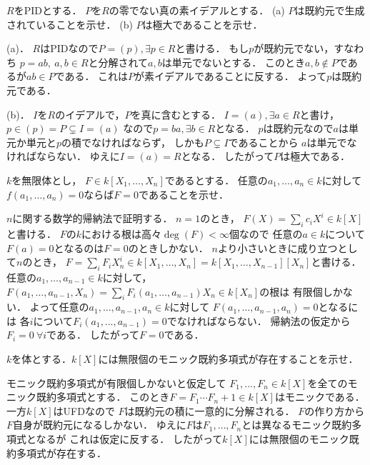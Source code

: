 \begin{prob}
  $R$をPIDとする．
  $P$を$R$の零でない真の素イデアルとする．
  (a) $P$は既約元で生成されていることを示せ．
  (b) $P$は極大であることを示せ．
\end{prob}
\begin{ans}
  (a)．
  $R$はPIDなので$P = (p), \exists p \in R$と書ける．
  もし$p$が既約元でない，すなわち
  $p = ab, \ a,b\in R$と分解されて$a,b$は単元でないとする．
  このとき$a,b \not\in P$であるが$ab \in P$である．
  これは$P$が素イデアルであることに反する．
  よって$p$は既約元である．

  (b)．
  $I$を$R$のイデアルで，$P$を真に含むとする．
  $I = (a), \exists a\in R$と書け，
  $p \in (p) = P \subsetneq I = (a)$
  なので$p = ba, \exists b \in R$となる．
  $p$は既約元なので$a$は単元か単元と$p$の積でなければならず，
  しかも$P \subsetneq I$であることから
  $a$は単元でなければならない．
  ゆえに$I = (a) = R$となる．
  したがって$P$は極大である．
\end{ans}

\begin{prob}
  $k$を無限体とし，
  $F \in k[X_1, \dots ,X_n]$であるとする．
  任意の$a_1,\dots ,a_n \in k$に対して
  $f(a_1,\dots,a_n) = 0$ならば$F = 0$であることを示せ．
\end{prob}
\begin{ans}
  $n$に関する数学的帰納法で証明する．
  $n=1$のとき，
  $F(X) = \sum_i c_i X^i \in k[X]$と書ける．
  $F$の$k$における根は高々$\deg(F) < \infty$個なので
  任意の$a \in k$について$F(a) = 0$となるのは$F = 0$のときしかない．
  $n$より小さいときに成り立つとして$n$のとき，
  $ F = \sum_i F_i X_n^i \in k[X_1,\dots ,X_n] = k[X_1,\dots,X_{n-1}][X_n]$と書ける．
  任意の$a_1,\dots,a_{n-1} \in k$に対して，
  $F(a_1, \dots, a_{n-1}, X_n) = \sum_i F_i(a_1,\dots,a_{n-1}) X_n \in k[X_n]$の根は
  有限個しかない．
  よって任意の$a_1,\dots, a_{n-1}, a_n \in k$に対して
  $F(a_1, \dots, a_{n-1}, a_n) = 0$となるには
  各$i$について$F_i (a_1, \dots, a_{n-1}) = 0$でなければならない．
  帰納法の仮定から$F_i = 0 \ \forall i$である．
  したがって$F = 0$である．
\end{ans}

\begin{prob}\label{無限個のモニック既約多項式}
  $k$を体とする．$k[X]$には無限個のモニック既約多項式が存在することを示せ．
\end{prob}
\begin{ans}
  モニック既約多項式が有限個しかないと仮定して
  $F_1,\dots,F_n \in k[X]$を全てのモニック既約多項式とする．
  このとき$F = F_1 \cdots F_n + 1 \in k[X]$はモニックである．
  一方$k[X]$はUFDなので
  $F$は既約元の積に一意的に分解される．
  $F$の作り方から$F$自身が既約元になるしかない．
  ゆえに$F$は$F_1,\dots,F_n$とは異なるモニック既約多項式となるが
  これは仮定に反する．
  したがって$k[X]$には無限個のモニック既約多項式が存在する．
\end{ans}


